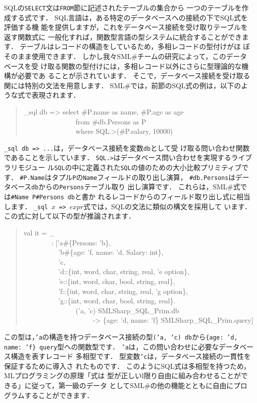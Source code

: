 \documentclass{jbook}
\newcommand{\smlsharp}{SML\#}
\newenvironment{program}{\begin{tt}\begin{quote}}{\end{quote}\end{tt}}
\newcommand{\myem}{\ \ \ \ \  }
\begin{document}
	SQLの{\tt SELECT}文は{\tt FROM}節に記述されたテーブルの集合から
一つのテーブルを作成する式です．
	SQL言語は，ある特定のデータベースへの接続の下でSQL式を評価する機
能を提供しますが，これをデータベース接続を受け取りテーブルを返す関数式に
一般化すれば，関数型言語の型システムに統合することができます．
	テーブルはレコードの構造をしているため，多相レコードの型付けがほ
ぼそのまま使用できます．
	しかし我々\smlsharp{}チームの研究によって，このデータベースを受
け取る関数の型付けには，多相レコード以外にさらに型理論的な機構が必要であ
ることが示されています\cite{ohori11}．
	そこで，データベース接続を受け取る関には特別の文法を用意します．
	\smlsharp{}では，前節のSQL式の例は，以下のような式で表現されます．
\begin{program}
\_sql db => select \#P.name as name, \#P.age as age\\
\myem\myem\myem from \#db.Persons as P\\
\myem\myem\myem where SQL.>(\#P.salary, 10000)
\end{program}
	{\tt \_sql db => ...}は，データベース接続を変数{\tt db}として受
け取る問い合わせ関数であることを示しています．
	{\tt SQL.>}はデータベース問い合わせを実現するライブラリモジュー
ル{\tt SQL}の中に定義された{\tt SQL}の値のための大小比較プリミティブです．
	{\tt \#P.Name}はタプル{\tt P}の{\tt Name}フィールドの取り出し演算，
{\tt \#db.Persons}はデータベース{\tt db}からの{\tt Persons}テーブル取り
出し演算です．
	これらは，\smlsharp{}式では{\tt \#Name P}{\tt \#Persons db}と書か
れるレコードからのフィールド取り出し式に相当します．
	{\tt \_sql $x$ => $expr$}式では，SQLの文法に類似の構文を採用して
います．
	この式に対して以下の型が推論されます．
\begin{program}
val it = \_
\\\myem\ \ \   : ['a\#\{Persons: 'b\},
\\\myem\myem     'b\#\{age: 'f, name: 'd, Salary: int\},
\\\myem\myem     'c,
\\\myem\myem     'd::\{int, word, char, string, real, 'e option\},
\\\myem\myem     'e::\{int, word, char, bool, string, real\},
\\\myem\myem     'f::\{int, word, char, string, real, 'g option\},
\\\myem\myem     'g::\{int, word, char, bool, string, real\}.
\\\myem\myem\myem       ('a, 'c) SMLSharp\_SQL\_Prim.db
\\\myem\myem\myem\myem  -> \{age: 'd, name: 'f\} SMLSharp\_SQL\_Prim.query]
\end{program}
	この型は，{\tt 'a}の構造を持つデータベース接続の型{\tt  ('a, 'c)
db}から{\tt \{age: 'd, name: 'f\} query}型への関数型です．
	{\tt 'a}は，この問い合わせに必要なデータベース構造を表すレコード
多相型です．
	型変数{\tt 'c}は，データベース接続の一貫性を保証するために導入さ
れたものです．
	このようにSQL式は多相型を持つため，MLプログラミングの原理「式は
型が正しいl限り自由に組み合わせることができる」に従って，第一級のデータ
として\smlsharp{}の他の機能とともに自由にプログラムすることができます．
\end{document}
